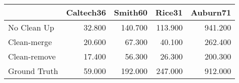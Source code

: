 \begin{tabular}{lrrrr}
\toprule
{} & Caltech36 & Smith60 &  Rice31 & Auburn71 \\
\midrule
No Clean Up  &    32.800 & 140.700 & 113.900 &  941.200 \\
Clean-merge  &    20.600 &  67.300 &  40.100 &  262.400 \\
Clean-remove &    17.400 &  56.300 &  26.300 &  200.300 \\
Ground Truth &    59.000 & 192.000 & 247.000 &  912.000 \\
\bottomrule
\end{tabular}
